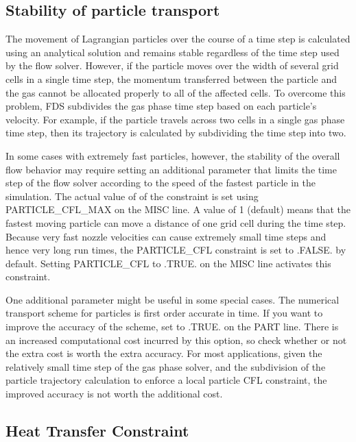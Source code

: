 \documentclass[11pt]{book}
\begin{document}
\subsection{Stability of particle transport}
\label{info:PART_Stability}

The movement of Lagrangian particles over the course of a time step is calculated using an analytical solution and remains stable regardless of the time step used by the flow solver. However, if the particle moves over the width of several grid cells in a single time step, the momentum transferred between the particle and the gas cannot be allocated properly to all of the affected cells. To overcome this problem, FDS subdivides the gas phase time step based on each particle's velocity. For example, if the particle travels across two cells in a single gas phase time step, then its trajectory is calculated by subdividing the time step into two.

In some cases with extremely fast particles, however, the stability of the overall flow behavior may require setting an additional parameter that limits the time step of the flow solver according to the speed of the fastest particle in the simulation.  The actual value of of the constraint is set using {\ct PARTICLE\_CFL\_MAX} on the {\ct MISC} line. A value of 1 (default) means that the fastest moving particle can move a distance of one grid cell during the time step. Because very fast nozzle velocities can cause extremely small time steps and hence very long run times, the {\ct PARTICLE\_CFL} constraint is set to {\ct .FALSE.} by default.  Setting {\ct PARTICLE\_CFL} to {\ct .TRUE.} on the {\ct MISC} line activates this constraint.

One additional parameter might be useful in some special cases. The numerical transport scheme for particles is first order accurate in time. If you want to improve the accuracy of the scheme, set  to {\ct .TRUE.} on the {\ct PART} line. There is an increased computational cost incurred by this option, so check whether or not the extra cost is worth the extra accuracy. For most applications, given the relatively small time step of the gas phase solver, and the subdivision of the particle trajectory calculation to enforce a local particle CFL constraint, the improved accuracy is not worth the additional cost.


\subsection{Heat Transfer Constraint}
\end{document}
